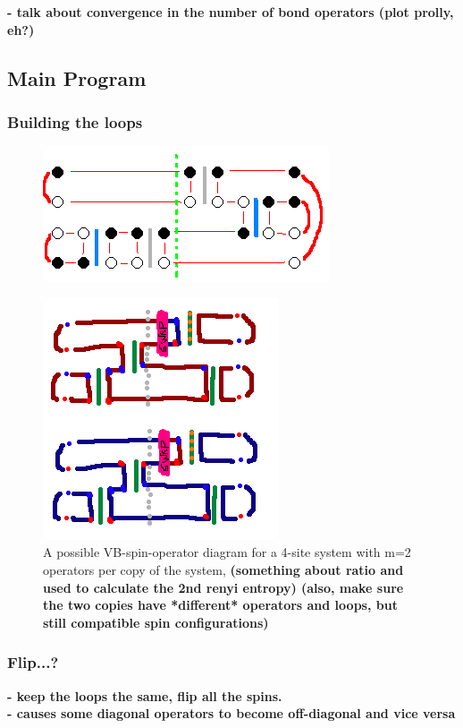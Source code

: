 \documentclass[prb,aps,twocolumn,floatfix,amsmath,amssymb,superscriptaddress,tightenlines]{revtex4}
\begin{document}
\noindent
{\bf
- talk about convergence in the number of bond operators (plot prolly, eh?)\\
}

\subsection{Main Program}
\subsubsection{Building the loops}

\begin{figure} {
\includegraphics[width=2.4 in]{fig_loop_alg.png} \caption{ 
\label{loops} }

} \end{figure}


\begin{figure} {
\includegraphics[width=2.4 in]{oplist.png} \caption{ 
\label{oplist} A possible VB-spin-operator diagram for a 4-site system with m=2 operators per copy of the system, {\bf (something about ratio and used to calculate the 2nd renyi entropy)
(also, make sure the two copies have *different* operators and loops, but still compatible spin configurations)}
}
} \end{figure}



\subsubsection{Flip...?}
\noindent 
{\bf
- keep the loops the same, flip all the spins.\\
- causes some diagonal operators to become off-diagonal and vice versa
}
\end{document}
